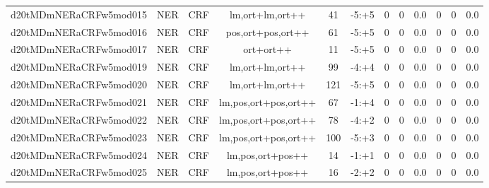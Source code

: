 \documentclass[a4paper]{article}
\begin{document}
\begin{landscape}
\begin{center}
\begin{tabular}{ |c|c|c|c|c|c|c|c|c|c|c|c|}
 
 	
 	\small{ d20tMDmNERaCRFw5mod015 } & \small{ NER} & \small{  CRF }  & lm,ort+lm,ort++  &  41 &  \small{  -5:+5 }  &  0 & 0 & 0.0  &  0 & 0 & 0.0 \\
 	

 
 	
 	\small{ d20tMDmNERaCRFw5mod016 } & \small{ NER} & \small{  CRF }  & pos,ort+pos,ort++  &  61 &  \small{  -5:+5 }  &  0 & 0 & 0.0  &  0 & 0 & 0.0 \\
 	

 
 	
 	\small{ d20tMDmNERaCRFw5mod017 } & \small{ NER} & \small{  CRF }  & ort+ort++  &  11 &  \small{  -5:+5 }  &  0 & 0 & 0.0  &  0 & 0 & 0.0 \\
 	

 
 	
 	\small{ d20tMDmNERaCRFw5mod019 } & \small{ NER} & \small{  CRF }  & lm,ort+lm,ort++  &  99 &  \small{  -4:+4 }  &  0 & 0 & 0.0  &  0 & 0 & 0.0 \\
 	

 
 	
 	\small{ d20tMDmNERaCRFw5mod020 } & \small{ NER} & \small{  CRF }  & lm,ort+lm,ort++  &  121 &  \small{  -5:+5 }  &  0 & 0 & 0.0  &  0 & 0 & 0.0 \\
 	

 
 	
 	\small{ d20tMDmNERaCRFw5mod021 } & \small{ NER} & \small{  CRF }  & lm,pos,ort+pos,ort++  &  67 &  \small{  -1:+4 }  &  0 & 0 & 0.0  &  0 & 0 & 0.0 \\
 	

 
 	
 	\small{ d20tMDmNERaCRFw5mod022 } & \small{ NER} & \small{  CRF }  & lm,pos,ort+pos,ort++  &  78 &  \small{  -4:+2 }  &  0 & 0 & 0.0  &  0 & 0 & 0.0 \\
 	

 
 	
 	\small{ d20tMDmNERaCRFw5mod023 } & \small{ NER} & \small{  CRF }  & lm,pos,ort+pos,ort++  &  100 &  \small{  -5:+3 }  &  0 & 0 & 0.0  &  0 & 0 & 0.0 \\
 	

 
 	
 	\small{ d20tMDmNERaCRFw5mod024 } & \small{ NER} & \small{  CRF }  & lm,pos,ort+pos++  &  14 &  \small{  -1:+1 }  &  0 & 0 & 0.0  &  0 & 0 & 0.0 \\
 	

 
 	
 	\small{ d20tMDmNERaCRFw5mod025 } & \small{ NER} & \small{  CRF }  & lm,pos,ort+pos++  &  16 &  \small{  -2:+2 }  &  0 & 0 & 0.0  &  0 & 0 & 0.0 \\
 	


\end{tabular}
\end{center}
\end{landscape}
\end{document}
